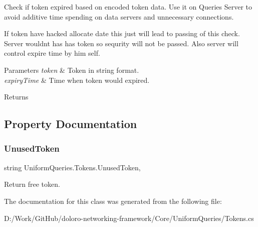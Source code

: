 Check if token expired based on encoded token data. Use it on Queries Server to avoid additive time spending on data servers and unnecessary connections. 

If token have hacked allocate date this just will lead to passing of this check. Server wouldn\textquotesingle{}t has has token so sequrity will not be passed. Also server will control expire time by him self. 


\begin{DoxyParams}{Parameters}
{\em token} & Token in string format.\\
\hline
{\em expiry\+Time} & Time when token would expired.\\
\hline
\end{DoxyParams}
\begin{DoxyReturn}{Returns}

\end{DoxyReturn}


\subsection{Property Documentation}
\mbox{\label{class_uniform_queries_1_1_tokens_af591930ab4fa60ebdf27724f84ac7a91}} 
\subsubsection{\texorpdfstring{Unused\+Token}{UnusedToken}}
{\footnotesize\ttfamily string Uniform\+Queries.\+Tokens.\+Unused\+Token\hspace{0.3cm}{\ttfamily [static]}, {\ttfamily [get]}}



Return free token. 



The documentation for this class was generated from the following file\+:\begin{DoxyCompactItemize}
\item 
D\+:/\+Work/\+Git\+Hub/doloro-\/networking-\/framework/\+Core/\+Uniform\+Queries/Tokens.\+cs\end{DoxyCompactItemize}
